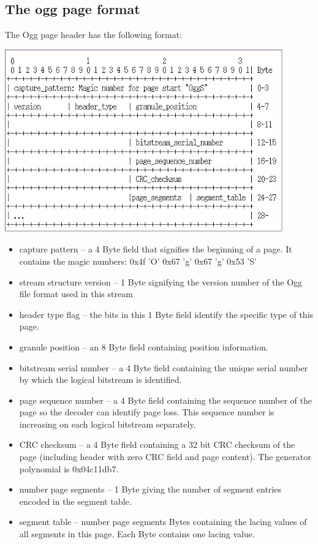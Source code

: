 \subsection{The ogg page format}
{
The Ogg page header has the following format:

\includegraphics[width=12cm]{data/oggpageheader.png}       

\begin{itemize}
\item capture pattern -- a 4 Byte field that signifies the beginning of a
       page.  It contains the magic numbers:
             0x4f 'O'
             0x67 'g'
             0x67 'g'
             0x53 'S'
\item stream structure version -- 1 Byte signifying the version number of the Ogg file format used in this stream
\item header type flag -- the bits in this 1 Byte field identify the specific type of this page.
\item granule position -- an 8 Byte field containing position information.
\item bitstream serial number -- a 4 Byte field containing the unique
       serial number by which the logical bitstream is identified.
\item page sequence number -- a 4 Byte field containing the sequence
       number of the page so the decoder can identify page loss.  This
       sequence number is increasing on each logical bitstream
       separately.
\item CRC checksum -- a 4 Byte field containing a 32 bit CRC checksum of
       the page (including header with zero CRC field and page content).
       The generator polynomial is 0x04c11db7.
\item number page segments -- 1 Byte giving the number of segment entries
       encoded in the segment table.
\item segment table -- number page segments Bytes containing the lacing
       values of all segments in this page.  Each Byte contains one
       lacing value.
\end{itemize}
}
